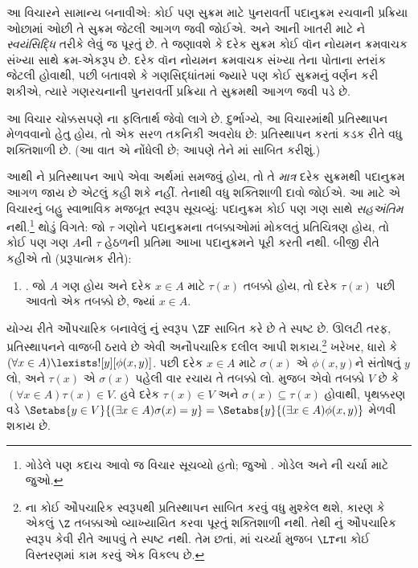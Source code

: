 આ વિચારને સામાન્ય બનાવીએ: કોઈ પણ સુક્રમ માટે
પુનરાવર્તી પદાનુક્રમ રચવાની પ્રક્રિયા ઓછામાં ઓછી તે
સુક્રમ જેટલી આગળ જવી જોઈએ. અને આની ખાતરી માટે
ને
\emph{સ્વયંસિદ્ધિ} તરીકે લેવું જ પૂરતું છે. તે જણાવશે
કે દરેક સુક્રમ કોઈ વૉન નોયમન ક્રમવાચક સંખ્યા સાથે
ક્રમ-એકરૂપ છે. દરેક વૉન નોયમન ક્રમવાચક સંખ્યા તેના
પોતાના સ્તરાંક જેટલી હોવાથી,
પછી બતાવશે કે ગણસિદ્ધાંતમાં જ્યારે પણ કોઈ સુક્રમનું
વર્ણન કરી શકીએ, ત્યારે ગણરચનાની પુનરાવર્તી પ્રક્રિયા
તે સુક્રમથી આગળ જવી પડે છે.

આ વિચાર ચોક્કસપણે \stagesinex{}ના ફલિતાર્થ જેવો લાગે
છે. દુર્ભાગ્યે, આ વિચારમાંથી પ્રતિસ્થાપન મેળવવાનો હેતુ
હોય, તો એક સરળ તકનિકી અવરોધ છે: પ્રતિસ્થાપન
કરતાં કડક રીતે વધુ શક્તિશાળી છે. (આ વાત
\citet[\S13.2]{Potter2004}એ નોંધેલી છે; આપણે તેને
માં
સાબિત કરીશું.)

આથી \stagesinex{}ને પ્રતિસ્થાપન આપે એવા અર્થમાં
સમજવું હોય, તો તે \emph{માત્ર} દરેક સુક્રમથી
પદાનુક્રમ આગળ જાય છે એટલું કહી શકે નહીં. તેનાથી
વધુ શક્તિશાળી દાવો જોઈએ. આ માટે \cite{Shoenfield:AST}એ
વિચારનું બહુ સ્વાભાવિક મજબૂત સ્વરૂપ સૂચવ્યું: પદાનુક્રમ
કોઈ પણ ગણ સાથે \emph{સહઅંતિમ} નથી.\footnote{ગોડેલે
પણ કદાચ આવો જ વિચાર સૂચવ્યો હતો; જુઓ
\citet[p.~223]{Potter2004}. ગોડેલ અને
\citeauthor{Shoenfield:AST}ની ચર્ચા માટે
\citet[90--5]{Incurvati2020} જુઓ.} થોડું વિગતે:
જો $\tau$ ગણોને પદાનુક્રમના તબક્કાઓમાં મોકલતું
પ્રતિચિત્રણ હોય, તો કોઈ પણ ગણ $A$ની $\tau$ હેઠળની
પ્રતિમા આખા પદાનુક્રમને પૂરી કરતી નથી. બીજી રીતે
કહીએ તો (પ્રરૂપાત્મક રીતે):
\begin{enumerate}
	\item[] \stagescofin. જો $A$ ગણ હોય અને દરેક
	$x \in A$ માટે $\tau(x)$ તબક્કો હોય, તો દરેક
	$\tau(x)$ પછી આવતો એક તબક્કો છે, જ્યાં $x \in A$.
\end{enumerate}
યોગ્ય રીતે ઔપચારિક બનાવેલું \stagescofin{}નું સ્વરૂપ
$\ZF$ સાબિત કરે છે તે સ્પષ્ટ છે. ઊલટી તરફ,
\stagescofin{} પ્રતિસ્થાપનને વાજબી ઠરાવે છે એવી
અનૌપચારિક દલીલ આપી શકાય.\footnote{\stagescofin{}ના
કોઈ ઔપચારિક સ્વરૂપથી પ્રતિસ્થાપન સાબિત કરવું વધુ મુશ્કેલ
થશે, કારણ કે એકલું $\Z$ તબક્કાઓ વ્યાખ્યાયિત કરવા
પૂરતું શક્તિશાળી નથી. તેથી \stagescofin{}નું
ઔપચારિક સ્વરૂપ કેવી રીતે આપવું તે સ્પષ્ટ નથી. તેમ છતાં,
માં ચર્ચ્યા મુજબ
$\LT$ના કોઈ વિસ્તરણમાં કામ કરવું એક વિકલ્પ છે.}
ખરેખર, ધારો કે $(\forall x \in A)\lexists![y][\phi(x,y)]$.
પછી દરેક $x \in A$ માટે $\sigma(x)$ એ
$\phi(x,y)$ને સંતોષતું $y$ લો, અને $\tau(x)$ એ
$\sigma(x)$ પહેલી વાર રચાય તે તબક્કો લો.
\stagescofin{} મુજબ એવો તબક્કો $V$ છે કે
$(\forall x \in A)\tau(x)\in V$. હવે દરેક
$\tau(x) \in V$ અને $\sigma(x) \subseteq \tau(x)$
હોવાથી, પૃથક્કરણ વડે
$\Setabs{y
\in V}{(\exists x \in A)\sigma(x) = y} = \Setabs{y}{(\exists x \in
A)\phi(x,y)}$ મેળવી શકાય છે.


